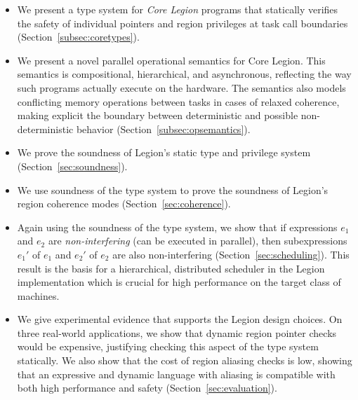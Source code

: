 \begin{itemize}
\item We present a type system for {\em Core Legion} programs that statically
  verifies the safety of individual pointers and region
  privileges at task call boundaries (Section~\ref{subsec:coretypes}).

\item We present a novel parallel operational semantics for Core Legion.
 This semantics is compositional,
  hierarchical, and asynchronous, reflecting the way such programs
  actually execute on the hardware.  The semantics also
  models conflicting memory operations between tasks in cases of relaxed
  coherence, making explicit the boundary between deterministic and
  possible non-deterministic behavior (Section~\ref{subsec:opsemantics}).

\item We prove the soundness of Legion's static type and privilege system (Section~\ref{sec:soundness}).


\item We use soundness of the type system to prove the soundness of
  Legion's region coherence modes (Section~\ref{sec:coherence}).


\item Again using the soundness of the type system,  we show that if expressions $e_1$ and $e_2$ 
are {\em non-interfering} (can be executed in parallel), then subexpressions
$e_1'$ of $e_1$ and $e_2'$ of $e_2$ are also non-interfering (Section~\ref{sec:scheduling}).  
This result is the basis
for a hierarchical, distributed scheduler in the Legion implementation which is crucial for high performance
on the target class of machines.

\item We give experimental evidence that supports the Legion design choices.  On three
  real-world applications, we show that dynamic region pointer checks
  would be expensive, justifying checking this aspect of the type
  system statically.  We also show that the cost of region aliasing
  checks is low, showing that an expressive and dynamic
  language with aliasing is compatible with both high
  performance and safety (Section~\ref{sec:evaluation}).

\end{itemize}






